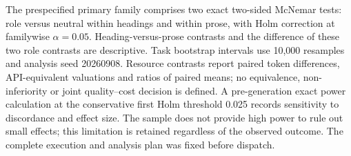 The prespecified primary family comprises two exact two-sided McNemar tests: role versus neutral within headings and within prose, with Holm correction at familywise $\alpha=0.05$. Heading-versus-prose contrasts and the difference of these two role contrasts are descriptive. Task bootstrap intervals use 10,000 resamples and analysis seed 20260908. Resource contrasts report paired token differences, API-equivalent valuations and ratios of paired means; no equivalence, non-inferiority or joint quality--cost decision is defined. A pre-generation exact power calculation at the conservative first Holm threshold 0.025 records sensitivity to discordance and effect size. The sample does not provide high power to rule out small effects; this limitation is retained regardless of the observed outcome. The complete execution and analysis plan was fixed before dispatch.
